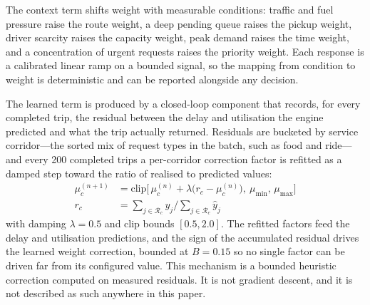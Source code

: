 \documentclass[conference]{IEEEtran}
\begin{document}
The context term shifts weight with measurable conditions: traffic and fuel pressure raise the route weight, a deep pending queue raises the pickup weight, driver scarcity raises the capacity weight, peak demand raises the time weight, and a concentration of urgent requests raises the priority weight. Each response is a calibrated linear ramp on a bounded signal, so the mapping from condition to weight is deterministic and can be reported alongside any decision.

The learned term is produced by a closed-loop component that records, for every completed trip, the residual between the delay and utilisation the engine predicted and what the trip actually returned. Residuals are bucketed by service corridor---the sorted mix of request types in the batch, such as food and ride---and every 200 completed trips a per-corridor correction factor is refitted as a damped step toward the ratio of realised to predicted values:
\begin{equation}
\begin{aligned}
\mu^{(n+1)}_c &= \text{clip}\big[ \, \mu^{(n)}_c + \lambda \big( r_c - \mu^{(n)}_c \big), \: \mu_{\min}, \, \mu_{\max} \big] \\
r_c &= {\textstyle \sum_{j \in \mathscr{R}_c}} y_j \Big/ {\textstyle \sum_{j \in \mathscr{R}_c}} \hat{y}_j
\end{aligned}
\end{equation}
with damping $\lambda = 0.5$ and clip bounds $[0.5, 2.0]$. The refitted factors feed the delay and utilisation predictions, and the sign of the accumulated residual drives the learned weight correction, bounded at $B = 0.15$ so no single factor can be driven far from its configured value. This mechanism is a bounded heuristic correction computed on measured residuals. It is not gradient descent, and it is not described as such anywhere in this paper.
\end{document}
